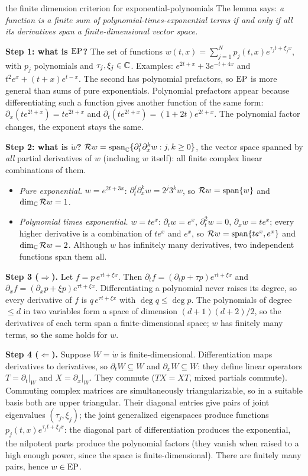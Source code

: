 \begin{explained}{the finite dimension criterion for exponential-polynomials}
The lemma says: \emph{a function is a finite sum of polynomial-times-exponential terms if and only if all its derivatives span a finite-dimensional vector space.}

\medskip\textbf{Step 1: what is $\mathrm{EP}$?} The set of functions $w(t,x)=\sum_{j=1}^Np_j(t,x)e^{\tau_jt+\xi_jx}$, with $p_j$ polynomials and $\tau_j,\xi_j\in\mathbb{C}$. Examples: $e^{2t+x}+3e^{-t+4x}$ and $t^2e^x+(t+x)e^{t-x}$. The second has polynomial prefactors, so $\mathrm{EP}$ is more general than sums of pure exponentials. Polynomial prefactors appear because differentiating such a function gives another function of the same form: $\partial_x(te^{2t+x})=te^{2t+x}$ and $\partial_t(te^{2t+x})=(1+2t)e^{2t+x}$. The polynomial factor changes, the exponent stays the same.

\medskip\textbf{Step 2: what is $\ring w$?} $\mathcal{R} w=\operatorname{span}_{\mathbb{C}}\{\partial_t^j\partial_x^kw:j,k\ge0\}$, the vector space spanned by \emph{all} partial derivatives of $w$ (including $w$ itself): all finite complex linear combinations of them.
\begin{itemize}[nosep]
\item \emph{Pure exponential.} $w=e^{2t+3x}$: $\partial_t^j\partial_x^kw=2^j3^kw$, so $\mathcal{R} w=\operatorname{span}\{w\}$ and $\dim_{\mathbb{C}}\mathcal{R} w=1$.
\item \emph{Polynomial times exponential.} $w=te^x$: $\partial_tw=e^x$, $\partial_t^2w=0$, $\partial_xw=te^x$; every higher derivative is a combination of $te^x$ and $e^x$, so $\mathcal{R} w=\operatorname{span}\{te^x,e^x\}$ and $\dim_{\mathbb{C}}\mathcal{R} w=2$. Although $w$ has infinitely many derivatives, two independent functions span them all.
\end{itemize}

\medskip\textbf{Step 3 ($\Rightarrow$).} Let $f=p\,e^{\tau t+\xi x}$. Then $\partial_tf=(\partial_tp+\tau p)e^{\tau t+\xi x}$ and $\partial_xf=(\partial_xp+\xi p)e^{\tau t+\xi x}$. Differentiating a polynomial never raises its degree, so every derivative of $f$ is $q\,e^{\tau t+\xi x}$ with $\deg q\le\deg p$. The polynomials of degree $\le d$ in two variables form a space of dimension $(d+1)(d+2)/2$, so the derivatives of each term span a finite-dimensional space; $w$ has finitely many terms, so the same holds for $w$.

\medskip\textbf{Step 4 ($\Leftarrow$).} Suppose $W=\ring w$ is finite-dimensional. Differentiation maps derivatives to derivatives, so $\partial_tW\subseteq W$ and $\partial_xW\subseteq W$: they define linear operators $T=\partial_t|_W$ and $X=\partial_x|_W$. They commute ($TX=XT$, mixed partials commute). Commuting complex matrices are simultaneously triangularizable, so in a suitable basis both are upper triangular. Their diagonal entries give pairs of joint eigenvalues $(\tau_j,\xi_j)$; the joint generalized eigenspaces produce functions $p_j(t,x)e^{\tau_jt+\xi_jx}$: the diagonal part of differentiation produces the exponential, the nilpotent parts produce the polynomial factors (they vanish when raised to a high enough power, since the space is finite-dimensional). There are finitely many pairs, hence $w\in\mathrm{EP}$.


\end{explained}
